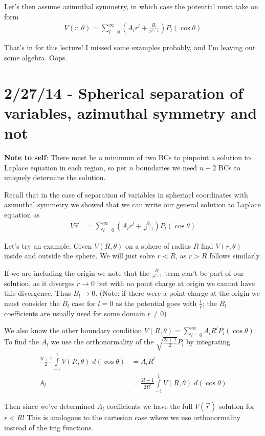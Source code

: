 \documentclass[10pt]{report}
\begin{document}
Let's then assume azimuthal symmetry, in which case the potential must take on form
\begin{align}
    V(r,\theta) = \sum_{l=0}^{\infty}\left( A_lr^l + \frac{B_l}{r^{l+1}} \right)P_l(\cos\theta)
\end{align}

That's in for this lecture! I missed some examples probably, and I'm leaving out some algebra. Oops.
\chapter{2/27/14 - Spherical separation of variables, azimuthal symmetry and not}

\textbf{Note to self}: There must be a minimum of two BCs to pinpoint a solution to Laplace equation in each region, so per $n$ boundaries we need $n+2$ BCs to uniquely determine the solution.

Recall that in the case of separation of variables in spheriacl coordinates with azimuthal symmetry we showed that we can write our general solution to Laplace equation as
\begin{align}
    V\vec{r} &= \sum_{l=0}^{\infty}\left( A_l r^l + \frac{B_l}{r^{l+1}} \right)P_l(\cos\theta)
\end{align}

Let's try an example. Given $V(R,\theta)$ on a sphere of radius $R$ find $V(r,\theta)$ inside and outside the sphere. We will just solve $r < R$, as $r > R$ follows similarly.

If we are including the origin we note that the $\frac{B_l}{r^{l+1}}$ term can't be part of our solution, as it diverges $r \to 0$ but with no point charge at origin we cannot have this divergence. Thus $B_l \to 0$. (Note: if there were a point charge at the origin we must consider the $B_l$ case for $l = 0$ as the potential goes with $\frac{1}{r}$; the $B_l$ coefficients are usually used for some domain $r \neq 0$)

We also know the other boundary condition $V(R,\theta) = \sum_{l=0}^{\infty}A_lR^lP_l(\cos\theta)$. To find the $A_l$ we use the orthonormality of the $\sqrt{\frac{2l+1}{2}}P_l$ by integrating
\begin{align}
    \frac{2l+1}{2}\displaystyle\int\limits_{-1}^{1}V(R,\theta)\;d(\cos\theta) &= A_lR^l\\
    A_l &= \frac{2l+1}{2R^l}\displaystyle\int\limits_{-1}^{1}V(R,\theta)\;d(\cos\theta)
\end{align}

Then since we've determined $A_l$ coefficients we have the full $V(\vec{r})$ solution for $r < R$! This is analogous to the cartesian case where we use orthonormality instead of the trig functions.
\end{document}
